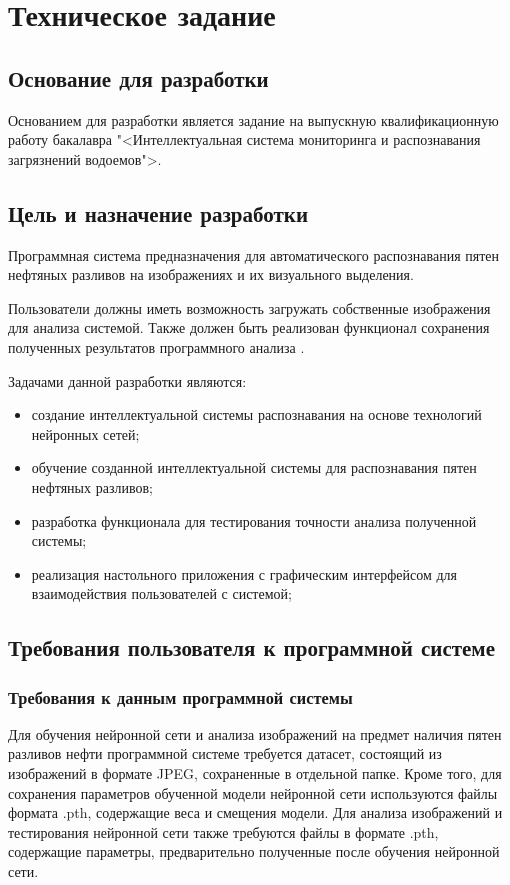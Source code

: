 \section{Техническое задание}
\subsection{Основание для разработки}

Основанием для разработки является задание на выпускную квалификационную работу бакалавра "<Интеллектуальная система мониторинга и распознавания загрязнений водоемов">.

\subsection{Цель и назначение разработки}

Программная система предназначения для автоматического распознавания пятен нефтяных разливов на изображениях и их визуального выделения.

Пользователи должны иметь возможность загружать собственные изображения для анализа системой. Также должен быть реализован функционал сохранения полученных результатов программного анализа .

Задачами данной разработки являются:
\begin{itemize}
\item создание интеллектуальной системы распознавания на основе технологий нейронных сетей;
\item обучение созданной интеллектуальной системы для распознавания пятен нефтяных разливов;
\item разработка функционала для тестирования точности анализа полученной системы;
\item реализация настольного приложения с графическим интерфейсом для взаимодействия пользователей с системой;
\end{itemize}

\subsection{Требования пользователя к программной системе}

\subsubsection{Требования к данным программной системы}

Для обучения нейронной сети и анализа изображений на предмет наличия пятен разливов нефти программной системе требуется датасет, состоящий из изображений в формате JPEG, сохраненные в отдельной папке. Кроме того, для сохранения параметров обученной модели нейронной сети используются файлы формата .pth, содержащие веса и смещения модели. Для анализа изображений и тестирования нейронной сети также требуются файлы в формате .pth, содержащие параметры, предварительно полученные после обучения нейронной сети.

